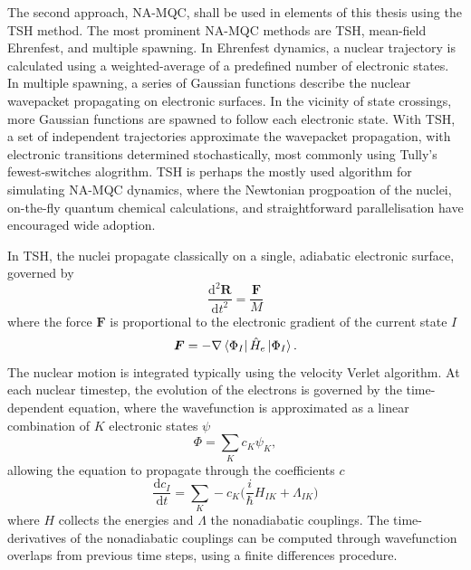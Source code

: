 The second approach, \ac{NA-MQC}, shall be used in elements of this thesis using the \ac{TSH} method. The most prominent \ac{NA-MQC} methods are \ac{TSH}, mean-field Ehrenfest, and multiple spawning.\cite{Crespo-Otero2018} In Ehrenfest dynamics, a nuclear trajectory is calculated using a weighted-average of a predefined number of electronic states. In multiple spawning, a series of Gaussian functions describe the nuclear wavepacket propagating on electronic surfaces. In the vicinity of state crossings, more Gaussian functions are spawned to follow each electronic state. With \ac{TSH}, a set of independent trajectories approximate the wavepacket propagation, with electronic transitions determined stochastically, most commonly using Tully's fewest-switches alogrithm.\cite{Tully1990} \ac{TSH} is perhaps the mostly used algorithm for simulating \ac{NA-MQC} dynamics, where the Newtonian progpoation of the nuclei, on-the-fly quantum chemical calculations, and straightforward parallelisation have encouraged wide adoption.\cite{Barbatti2011}

In \ac{TSH}, the nuclei propagate classically on a single, adiabatic electronic surface, governed by 
\begin{equation}\label{equation: nuclei_prop}
    \frac{\mathrm{d}^{2}\bm{R}}{\mathrm{d}t^{2}}=\frac{\bm{F}}{M}
\end{equation}
where the force $\bm{F}$ is proportional to the electronic gradient of the current state $I$
\begin{equation}
    \bm{F}=-\nabla{}\bra{\Phi_{I}}\hat{H}_{e}\ket{\Phi_{I}}.
\end{equation}
The nuclear motion is integrated typically using the velocity Verlet algorithm.\cite{Swope1982} At each nuclear timestep, the evolution of the electrons is governed by the time-dependent \schro{} equation, where the wavefunction is approximated as a linear combination of $K$ electronic states $\psi$
\begin{equation}
    \Phi{}=\sum_{K}c_{K}\psi_{K},
\end{equation}
allowing the \schro{} equation to propagate through the coefficients $c$
\begin{equation}\label{equation: sc-schro}
    \frac{\mathrm{d}c_{I}}{\mathrm{d}t}=\sum_{K}-c_{K}\big(\frac{i}{\hbar}H_{IK}+\Lambda_{IK}\big)
\end{equation}
where $H$ collects the energies and $\Lambda$ the nonadiabatic couplings. The time-derivatives of the nonadiabatic couplings can be computed through wavefunction overlaps from previous time steps, using a finite differences procedure.\cite{Pittner2009,Ryabinkin2015}

